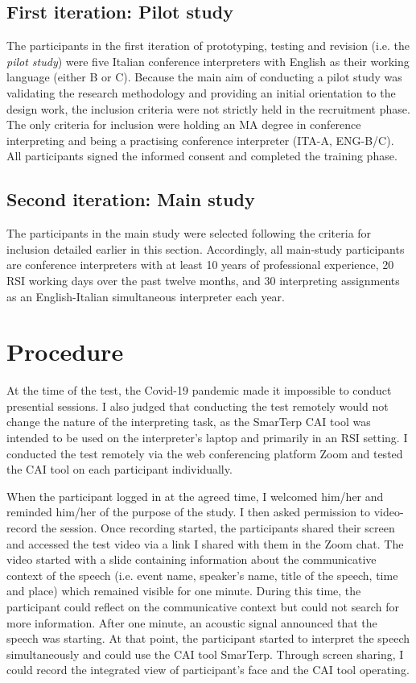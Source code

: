 \subsection{First iteration: Pilot study}


The participants in the first iteration of prototyping, testing and revision (i.e. the \textit{pilot study}) were five Italian conference interpreters with English as their working language (either B or C). Because the main aim of conducting a pilot study was validating the research methodology and providing an initial orientation to the design work, the inclusion criteria were not strictly held in the recruitment phase. The only criteria for inclusion were holding an MA degree in conference interpreting and being a practising conference interpreter (ITA-A, ENG-B/C). All participants signed the informed consent and completed the training phase.



\subsection{Second iteration: Main study}


The participants in the main study were selected following the criteria for inclusion detailed earlier in this section. Accordingly, all main-study participants are conference interpreters with at least 10 years of professional experience, 20 RSI working days over the past twelve months, and 30 interpreting assignments as an English-Italian simultaneous interpreter each year.


\section{Procedure}


At the time of the test, the Covid-19 pandemic made it impossible to conduct presential sessions. I also judged that conducting the test remotely would not change the nature of the interpreting task, as the SmarTerp CAI tool was intended to be used on the interpreter’s laptop and primarily in an RSI setting. I conducted the test remotely via the web conferencing platform Zoom and tested the CAI tool on each participant individually.

When the participant logged in at the agreed time, I welcomed him/her and reminded him/her of the purpose of the study. I then asked permission to video-record the session. Once recording started, the participants shared their screen and accessed the test video via a link I shared with them in the Zoom chat. The video started with a slide containing information about the communicative context of the speech (i.e. event name, speaker’s name, title of the speech, time and place) which remained visible for one minute. During this time, the participant could reflect on the communicative context but could not search for more information. After one minute, an acoustic signal announced that the speech was starting. At that point, the participant started to interpret the speech simultaneously and could use the CAI tool SmarTerp. Through screen sharing, I could record the integrated view of participant’s face and the CAI tool operating.

